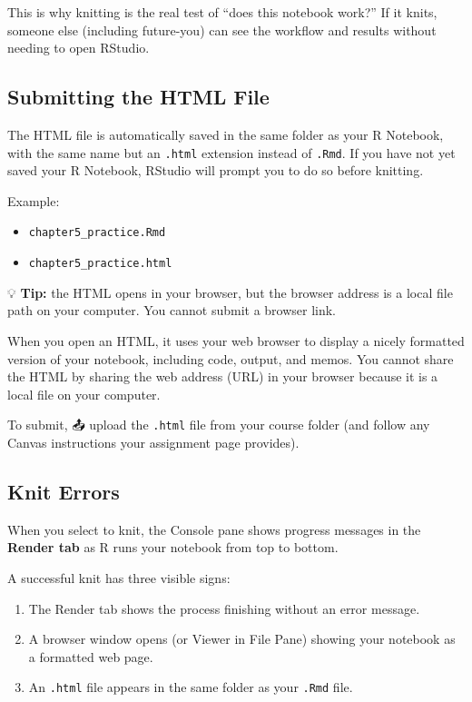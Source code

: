 \documentclass[
  12pt,
]{scrreprt}
\begin{document}
This is why knitting is the real test of ``does this notebook work?'' If
it knits, someone else (including future-you) can see the workflow and
results without needing to open RStudio.

\subsection{Submitting the HTML File}\label{submitting-the-html-file}

The HTML file is automatically saved in the same folder as your R
Notebook, with the same name but an \texttt{.html} extension instead of
\texttt{.Rmd}. If you have not yet saved your R Notebook, RStudio will
prompt you to do so before knitting.

Example:

\begin{itemize}
\item
  \texttt{chapter5\_practice.Rmd}
\item
  \texttt{chapter5\_practice.html}
\end{itemize}

💡 \textbf{Tip:} the HTML opens in your browser, but the browser address
is a local file path on your computer. You cannot submit a browser link.

When you open an HTML, it uses your web browser to display a nicely
formatted version of your notebook, including code, output, and memos.
You cannot share the HTML by sharing the web address (URL) in your
browser because it is a local file on your computer.

To submit, 📤 upload the \texttt{.html} file from your course folder
(and follow any Canvas instructions your assignment page provides).

\subsection{Knit Errors}\label{knit-errors}

When you select to knit, the Console pane shows progress messages in the
\textbf{Render tab} as R runs your notebook from top to bottom.

A successful knit has three visible signs:

\begin{enumerate}
\def\labelenumi{\arabic{enumi}.}
\item
  The Render tab shows the process finishing without an error message.
\item
  A browser window opens (or Viewer in File Pane) showing your notebook
  as a formatted web page.
\item
  An \texttt{.html} file appears in the same folder as your
  \texttt{.Rmd} file.
\end{enumerate}
\end{document}
